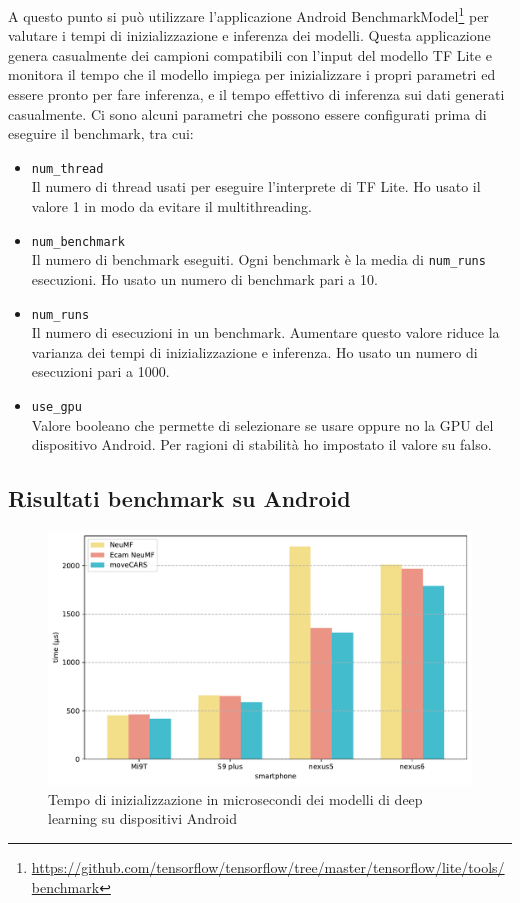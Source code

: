 \documentclass[12pt,italian]{report}
\begin{document}
\noindent A questo punto si può utilizzare l'applicazione Android BenchmarkModel\footnote{\url{https://github.com/tensorflow/tensorflow/tree/master/tensorflow/lite/tools/benchmark}} per valutare i tempi di inizializzazione e inferenza dei modelli. Questa applicazione genera casualmente dei campioni compatibili con l'input del modello TF Lite e monitora il tempo che il modello impiega per inizializzare i propri parametri ed essere pronto per fare inferenza, e il tempo effettivo di inferenza sui dati generati casualmente. Ci sono alcuni parametri che possono essere configurati prima di eseguire il benchmark, tra cui:
\begin{itemize}
\item \texttt{num\_thread} \\ Il numero di thread usati per eseguire l'interprete di TF Lite. Ho usato il valore 1 in modo da evitare il multithreading.
\item \texttt{num\_benchmark} \\ Il numero di benchmark eseguiti. Ogni benchmark è la media di \texttt{num\_runs} esecuzioni. Ho usato un numero di benchmark pari a 10.
\item \texttt{num\_runs} \\ Il numero di esecuzioni in un benchmark. Aumentare questo valore riduce la varianza dei tempi di inizializzazione e inferenza. Ho usato un numero di esecuzioni pari a 1000.
\item \texttt{use\_gpu} \\ Valore booleano che permette di selezionare se usare oppure no la GPU del dispositivo Android. Per ragioni di stabilità ho impostato il valore su falso.
\end{itemize}

\subsection{Risultati benchmark su Android}

\begin{figure}
  \centering
  \includegraphics[width=\linewidth]{immagini/init_tflite.pdf}
  \caption{Tempo di inizializzazione in microsecondi dei modelli di deep learning su dispositivi Android}
  \label{fig:init-time}
\end{figure}
\end{document}
